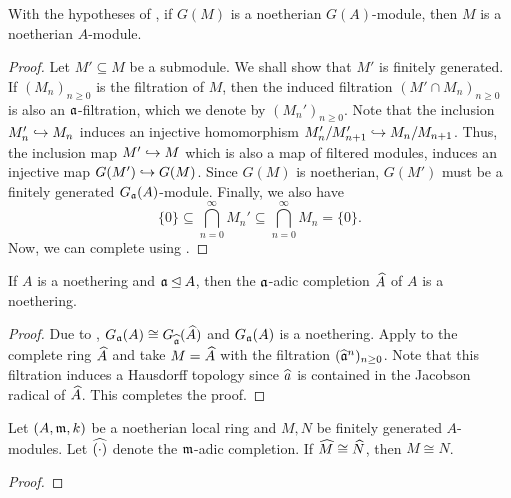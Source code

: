 \begin{corollary}
    With the hypotheses of , if $G(M)$ is a noetherian $G(A)$-module, then $M$ is a noetherian $A$-module.
\end{corollary}
\begin{proof}
    Let $M'\subseteq M$ be a submodule. We shall show that $M'$ is finitely generated. If $(M_n)_{n\ge 0}$ is the filtration of $M$, then the induced filtration $(M'\cap M_n)_{n\ge 0}$ is also an $\mathfrak a$-filtration, which we denote by $(M_n')_{n\ge 0}$. Note that the inclusion $M_n'\hookrightarrow M_n$ induces an injective homomorphism $M_n'/M_{n + 1}'\hookrightarrow M_n/M_{n + 1}$. Thus, the inclusion map $M'\hookrightarrow M$ which is also a map of filtered modules, induces an injective map $G(M')\hookrightarrow G(M)$. Since $G(M)$ is noetherian, $G(M')$ must be a finitely generated $G_\mathfrak a(A)$-module. Finally, we also have 
    \begin{equation*}
        \{0\}\subseteq\bigcap_{n = 0}^\infty M_n'\subseteq\bigcap_{n = 0}^\infty M_n = \{0\}.
    \end{equation*}
    Now, we can complete using .
\end{proof}


\begin{theorem}
    If $A$ is a noethering and $\mathfrak a\unlhd A$, then the $\mathfrak a$-adic completion $\widehat{A}$ of $A$ is a noethering.
\end{theorem}
\begin{proof}
    Due to , $G_\mathfrak a(A)\cong G_{\widehat{\mathfrak a}}(\widehat{A})$ and $G_{\mathfrak a}(A)$ is a noethering. Apply  to the complete ring $\widehat{A}$ and take $M = \widehat{A}$ with the filtration $(\widehat{\mathfrak a}^n)_{n\ge 0}$. Note that this filtration induces a Hausdorff topology since $\widehat{a}$ is contained in the Jacobson radical of $\widehat{A}$. This completes the proof.
\end{proof}

\hrulefill 

\begin{theorem}
    Let $(A,\mathfrak m, k)$ be a noetherian local ring and $M, N$ be finitely generated $A$-modules. Let $\widehat{(\cdot)}$ denote the $\mathfrak m$-adic completion. If $\widehat{M}\cong\widehat{N}$, then $M\cong N$.
\end{theorem}
\begin{proof}
    
\end{proof}